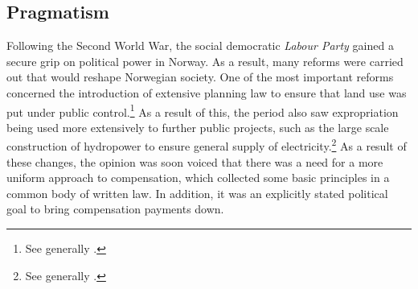%

\subsection{Pragmatism}\label{sec:prag}

Following the Second World War, the social democratic \emph{Labour Party} gained a secure grip on political power in Norway. As a result, many reforms were carried out that would reshape Norwegian society. One of the most important reforms concerned the introduction of extensive planning law to ensure that land use was put under public control.\footnote{See generally \cite{thomassen97,kleven11}.} As a result of this, the period also saw expropriation being used more extensively to further public projects, such as the large scale construction of hydropower to ensure general supply of electricity.\footnote{See generally \cite{skjold06,thue06b}.} As a result of these changes, the opinion was soon voiced that there was a need for a more uniform approach to compensation, which collected some basic principles in a common body of written law. In addition, it was an explicitly stated political goal to bring compensation payments down.

